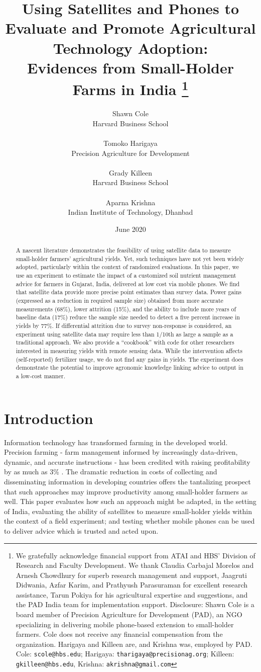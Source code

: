 \documentclass{article}
\title{\large \textbf{Using Satellites and Phones to Evaluate and Promote Agricultural Technology Adoption: \\ Evidences from Small-Holder Farms in India}%
\thanks{We gratefully acknowledge financial support from ATAI and HBS’ Division of Research and Faculty Development. We thank Claudia Carbajal Morelos and Arnesh Chowdhury for superb research management and support, Jaagruti Didwania, Azfar Karim, and Prathyush Parasuraman for excellent research assistance, Tarun Pokiya for his agricultural expertise and suggestions, and the PAD India team for implementation support. 
Disclosure: Shawn Cole is a board member of Precision Agriculture for Development (PAD), an NGO specializing in delivering mobile phone-based extension to small-holder farmers. Cole does not receive any financial compensation from the organization. Harigaya and Killeen are, and Krishna was, employed by PAD. Cole: \texttt{scole@hbs.edu}; Harigaya: \texttt{tharigaya@precisionag.org}; Killeen: \texttt{gkilleen@hbs.edu}, Krishna: \texttt{akrishna@gmail.com}}}
\author{Shawn Cole \\[-0.5em] Harvard Business School \\ \\[-0.5em] Tomoko Harigaya \\[-0.5em] Precision Agriculture for Development \\ \\[-0.5em] Grady Killeen \\[-0.5em] Harvard Business School \\ \\[-0.5em] Aparna Krishna \\[-0.5em] Indian Institute of Technology, Dhanbad}
\date{June 2020}
\begin{document}


\begin{titlepage}

\maketitle
    \begin{abstract}
        \singlespace
        A nascent literature demonstrates the feasibility of using satellite data to measure small-holder farmers’ agricultural yields. Yet, such techniques have not yet been widely adopted, particularly within the context of randomized evaluations. In this paper, we use an experiment to estimate the impact of a customized soil nutrient management advice for farmers in Gujarat, India, delivered at low cost via mobile phones. We find that satellite data provide more precise point estimates than survey data. Power gains (expressed as a reduction in required sample size) obtained from more accurate measurements (68\%), lower attrition (15\%), and the ability to include more years of baseline data (17\%) reduce the sample size needed to detect a five percent increase in yields by 77\%. If differential attrition due to survey non-response is considered, an experiment using satellite data may require less than 1/10th as large a sample as a traditional approach. We also provide a ``cookbook'' with code for other researchers interested in measuring yields with remote sensing data. While the intervention affects (self-reported) fertilizer usage, we do not find any gains in yields. The experiment does demonstrate the potential to improve agronomic knowledge linking advice to output in a low-cost manner.
    \end{abstract}
\end{titlepage}

\section{Introduction}

Information technology has transformed farming in the developed world. Precision farming - farm management informed by increasingly data-driven, dynamic, and accurate instructions - has been credited with raising profitability by as much as 3\% \citep{Schimmelpfennig2016FarmAgriculture}. The dramatic reduction in costs of collecting and disseminating information in developing countries offers the tantalizing prospect that such approaches may improve productivity among small-holder farmers as well. This paper evaluates how such an approach might be adapted, in the setting of India, evaluating the ability of satellites to measure small-holder yields within the context of a field experiment; and testing whether mobile phones can be used to deliver advice which is trusted and acted upon. 
\end{document}
